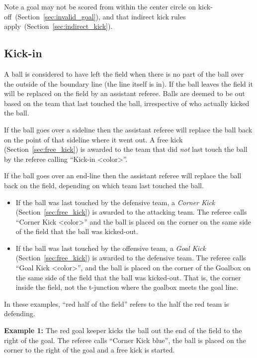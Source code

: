 Note a goal may not be scored from within the center circle on kick-off~(\cf Section~\ref{sec:invalid_goal}), and that indirect kick rules apply~(\cf Section~\ref{sec:indirect_kick}).

\subsection{Kick-in}
\label{sec:kick_in}

A ball is considered to have left the field when there is no part of the ball over the outside of the boundary line (\ie the line itself is in). If the ball leaves the field it will be replaced on the field by an assistant referee. Balls are deemed to be out based on the team that last touched the ball, irrespective of who actually kicked the ball.

If the ball goes over a sideline then the assistant referee will replace the ball back on the point of that sideline where it went out. A free kick (\cf Section~\ref{sec:free_kick}) is awarded to the team that did \emph{not} last touch the ball by the referee calling ``Kick-in \textless color\textgreater''.

If the ball goes over an end-line then the assistant referee will replace the ball back on the field, depending on which team last touched the ball.

\begin{itemize}
  \item If the ball was last touched by the defensive team, a \emph{Corner Kick} (\cf Section~\ref{sec:free_kick}) is awarded to the attacking team. The referee calls ``Corner Kick \textless color\textgreater'' and the ball is placed on the corner on the same side of the field that the ball was kicked-out.
  \item If the ball was last touched by the offensive team, a \emph{Goal Kick} (\cf Section~\ref{sec:free_kick}) is awarded to the defensive team. The referee calls ``Goal Kick \textless color\textgreater'', and the ball is placed on the corner of the Goalbox on the same side of the field that the ball was kicked-out. That is, the corner inside the field, not the t-junction where the goalbox meets the goal line.
\end{itemize}

In these examples, ``red half of the field'' refers to the half the red team is defending.

  \textbf{Example 1:} The red goal keeper kicks the ball out the end of the field to the right of the goal. The referee calls ``Corner Kick blue'', the ball is placed on the corner to the right of the goal and a free kick is started.

